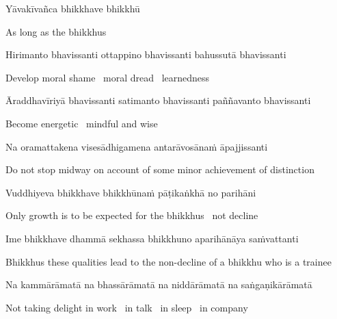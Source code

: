 Yāvakīvañca bhikkhave bhikkhū

\begin{english}
  As long as the bhikkhus
\end{english}

Hirimanto bhavissanti ottappino bhavissanti bahussutā bhavissanti

\begin{english}
  Develop moral shame \breathmark\ moral dread \breathmark\ learnedness
\end{english}

\begin{pali-hang}
  Āraddhavīriyā bhavissanti satimanto bhavissanti paññavanto bhavissanti
\end{pali-hang}

\begin{english}
  Become energetic \breathmark\ mindful and wise
\end{english}

Na oramattakena visesādhigamena antarāvosānaṁ āpajjissanti

\begin{english-hang}
  Do not stop midway on account of some minor achievement of distinction
\end{english-hang}

Vuddhiyeva bhikkhave bhikkhūnaṁ pāṭikaṅkhā no parihāni

\begin{english}
  Only growth is to be expected for the bhikkhus \breathmark\ not decline
\end{english}

\suttaRef{[AN 7.23-27]}

\begin{pali-hang}
  Ime bhikkhave dhammā sekhassa bhikkhuno aparihānāya saṁvattanti
\end{pali-hang}

\begin{english-hang}
  Bhikkhus these qualities lead to the non-decline of a bhikkhu who is a trainee
\end{english-hang}

\begin{pali-hang}
  Na kammārāmatā na bhassārāmatā na niddārāmatā na saṅgaṇikārāmatā
\end{pali-hang}

\begin{english}
  Not taking delight in work \breathmark\ in talk \breathmark\ in sleep \breathmark\ in company
\end{english}

